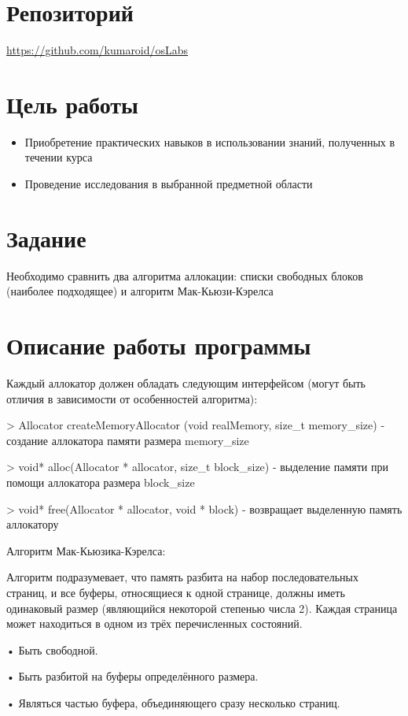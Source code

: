 \documentclass[a4paper, 12pt]{article}
\begin{document}
\section{Репозиторий}
\href{https://github.com/kumaroid/osLabs}{https://github.com/kumaroid/osLabs}

\section{Цель работы}
\begin{itemize}
  \item Приобретение практических навыков в использовании знаний, полученных в течении 
  курса
  \item Проведение исследования в выбранной предметной области
\end{itemize}

\section{Задание}
Необходимо сравнить два алгоритма аллокации: списки свободных блоков (наиболее 
подходящее) и алгоритм Мак-Кьюзи-Кэрелса

\section{Описание работы программы}
Каждый аллокатор должен обладать следующим интерфейсом (могут быть отличия в зависимости от 
особенностей алгоритма):

    > Allocator createMemoryAllocator (void realMemory, size\_t memory\_size) - создание аллокатора памяти размера memory\_size

    > void* alloc(Allocator * allocator, size\_t block\_size) - выделение памяти при помощи аллокатора размера block\_size

    > void* free(Allocator * allocator, void * block) - возвращает выделенную память аллокатору


Алгоритм Мак-Кьюзика-Кэрелса:

    Алгоритм подразумевает, что память разбита на набор последовательных страниц, и все буферы, относящиеся к одной странице, должны иметь одинаковый размер (являющийся некоторой степенью числа 2).
    Каждая страница может находиться в одном из трёх перечисленных состояний.

    •	Быть свободной. 

    •	Быть разбитой на буферы определённого размера.

    •	Являться частью буфера, объединяющего сразу несколько страниц. 
    
\end{document}
